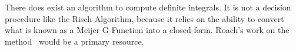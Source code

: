 There does exist an algorithm to compute definite integrals.  It is not
a decision procedure like the Risch Algorithm, because it relies on the
ability to convert what is known as a Meijer G-Function into a
closed-form.  Roach's work on the method~\cite{roach1997meijerg} would
be a primary resource.  